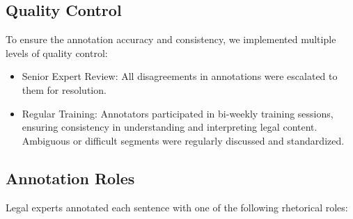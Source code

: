 \subsection{Quality Control}
To ensure the annotation accuracy and consistency, we implemented multiple levels of quality control:
\begin{itemize}
    \item Senior Expert Review: All disagreements in annotations were escalated to them for resolution.
    
    \item Regular Training: Annotators participated in bi-weekly training sessions, ensuring consistency in understanding and interpreting legal content. Ambiguous or difficult segments were regularly discussed and standardized.
\end{itemize}

\subsection{Annotation Roles}
Legal experts annotated each sentence with one of the following rhetorical roles:

